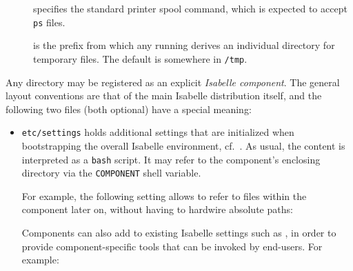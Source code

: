 \begin{isabellebody}
\begin{isamarkuptext}
\begin{description}
  \item[\hypertarget{setting.PRINT-COMMAND}{\hyperlink{setting.PRINT-COMMAND}{\mbox{}}}] specifies the standard printer
  spool command, which is expected to accept \verb|ps| files.
  
  \item[\hypertarget{setting.ISABELLE-TMP-PREFIX}{\hyperlink{setting.ISABELLE-TMP-PREFIX}{\mbox{}}}] is the
  prefix from which any running \hyperlink{executable.isabelle-process}{\mbox{}}
  derives an individual directory for temporary files.  The default is
  somewhere in \verb|/tmp|.
  
  \end{description}%
\end{isamarkuptext}%
\isamarkuptrue%
%
\isamarkuptrue%
%
\begin{isamarkuptext}%
Any directory may be registered as an explicit \emph{Isabelle
  component}.  The general layout conventions are that of the main
  Isabelle distribution itself, and the following two files (both
  optional) have a special meaning:

  \begin{itemize}

  \item \verb|etc/settings| holds additional settings that are
  initialized when bootstrapping the overall Isabelle environment,
  cf.\ .  As usual, the content is interpreted as a
  \verb|bash| script.  It may refer to the component's enclosing
  directory via the \verb|COMPONENT| shell variable.

  For example, the following setting allows to refer to files within
  the component later on, without having to hardwire absolute paths:


  Components can also add to existing Isabelle settings such as
  \hypertarget{setting.ISABELLE-TOOLS}{\hyperlink{setting.ISABELLE-TOOLS}{\mbox{}}}, in order to provide
  component-specific tools that can be invoked by end-users.  For
  example:


\end{itemize}
\end{isamarkuptext}
\end{isabellebody}
